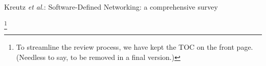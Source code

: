 \documentclass[journal]{IEEEtran}
\begin{document}
% 
%

%
{Kreutz \MakeLowercase{\textit{et al.}}: Software-Defined Networking: a comprehensive survey}
% 





\maketitle

\tableofcontents\footnote{To streamline the review process, we have kept the TOC on the front page. (Needless to say, to be removed in a final version.)}
\end{document}
